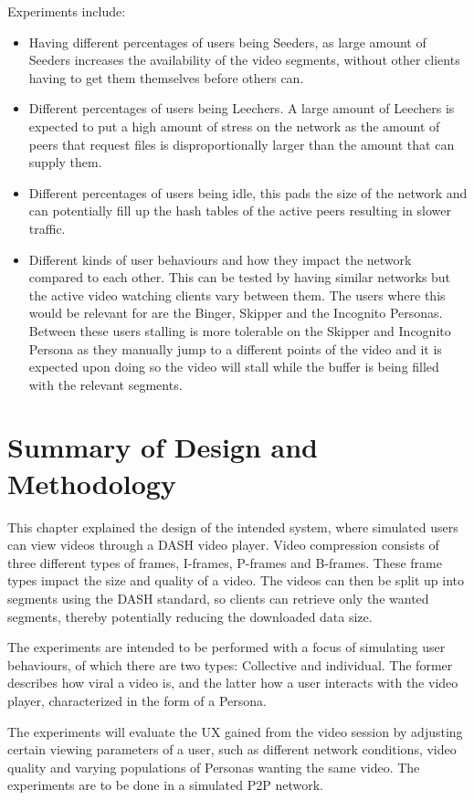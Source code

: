 Experiments include:
\begin{itemize}
\item Having different percentages of users being Seeders, as large amount of Seeders increases the availability of the video segments, without other clients having to get them themselves before others can.

\item Different percentages of users being Leechers. A large amount of Leechers is expected to put a high amount of stress on the network as the amount of peers that request files is disproportionally larger than the amount that can supply them.

\item Different percentages of users being idle, this pads the size of the network and can potentially fill up the hash tables of the active peers resulting in slower traffic.

\item Different kinds of user behaviours and how they impact the network compared to each other. This can be tested by having similar networks but the active video watching clients vary between them. The users where this would be relevant for are the Binger, Skipper and the Incognito Personas. Between these users stalling is more tolerable on the Skipper and Incognito Persona as they manually jump to a different points of the video and it is expected upon doing so the video will stall while the buffer is being filled with the relevant segments.
\end{itemize}

\section{Summary of Design and Methodology}
This chapter explained the design of the intended system, where simulated users can view videos through a \ac{DASH} video player. Video compression consists of three different types of frames, \acp{I-frame}, \acp{P-frame} and \acp{B-frame}. These frame types impact the size and quality of a video. The videos can then be split up into segments using the \ac{DASH} standard, so clients can retrieve only the wanted segments, thereby potentially reducing the downloaded data size.

The experiments are intended to be performed with a focus of simulating user behaviours, of which there are two types: Collective and individual. The former describes how viral a video is, and the latter how a user interacts with the video player, characterized in the form of a Persona.

The experiments will evaluate the \ac{UX} gained from the video session by adjusting certain viewing parameters of a user, such as different network conditions, video quality and varying populations of Personas wanting the same video. The experiments are to be done in a simulated \ac{P2P} network.
